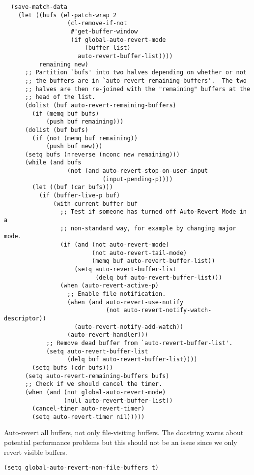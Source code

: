 \documentclass[11pt]{article}
\begin{document}
\begin{verbatim}
  (save-match-data
    (let ((bufs (el-patch-wrap 2
                  (cl-remove-if-not
                   #'get-buffer-window
                   (if global-auto-revert-mode
                       (buffer-list)
                     auto-revert-buffer-list))))
          remaining new)
      ;; Partition `bufs' into two halves depending on whether or not
      ;; the buffers are in `auto-revert-remaining-buffers'.  The two
      ;; halves are then re-joined with the "remaining" buffers at the
      ;; head of the list.
      (dolist (buf auto-revert-remaining-buffers)
        (if (memq buf bufs)
            (push buf remaining)))
      (dolist (buf bufs)
        (if (not (memq buf remaining))
            (push buf new)))
      (setq bufs (nreverse (nconc new remaining)))
      (while (and bufs
                  (not (and auto-revert-stop-on-user-input
                            (input-pending-p))))
        (let ((buf (car bufs)))
          (if (buffer-live-p buf)
              (with-current-buffer buf
                ;; Test if someone has turned off Auto-Revert Mode in a
                ;; non-standard way, for example by changing major mode.
                (if (and (not auto-revert-mode)
                         (not auto-revert-tail-mode)
                         (memq buf auto-revert-buffer-list))
                    (setq auto-revert-buffer-list
                          (delq buf auto-revert-buffer-list)))
                (when (auto-revert-active-p)
                  ;; Enable file notification.
                  (when (and auto-revert-use-notify
                             (not auto-revert-notify-watch-descriptor))
                    (auto-revert-notify-add-watch))
                  (auto-revert-handler)))
            ;; Remove dead buffer from `auto-revert-buffer-list'.
            (setq auto-revert-buffer-list
                  (delq buf auto-revert-buffer-list))))
        (setq bufs (cdr bufs)))
      (setq auto-revert-remaining-buffers bufs)
      ;; Check if we should cancel the timer.
      (when (and (not global-auto-revert-mode)
                 (null auto-revert-buffer-list))
        (cancel-timer auto-revert-timer)
        (setq auto-revert-timer nil)))))
\end{verbatim}

Auto-revert all buffers, not only file-visiting buffers. The docstring
warns about potential performance problems but this should not be an
issue since we only revert visible buffers.

\begin{verbatim}
(setq global-auto-revert-non-file-buffers t)
\end{verbatim}
\end{document}
